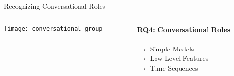 \begin{frame}{Recognizing Conversational Roles}
  \centering
    \begin{columns}[T] %
      \begin{column}{.5\textwidth}
        \texttt{[image: conversational\_group]}
      \end{column}
      \begin{column}{.5\textwidth}
        \vspace{10pt}
        \textbf{RQ4: Conversational Roles}\\\vspace{5pt} 
         \\
      \vspace{10pt}
       \(\rightarrow\) \hspace{5pt} Simple Models\\
       \vspace{5pt}
       \(\rightarrow\) \hspace{5pt} Low-Level Features\\
       \vspace{5pt}
       \(\rightarrow\) \hspace{5pt} Time Sequences\\
      \end{column}
    \end{columns}
\end{frame}
